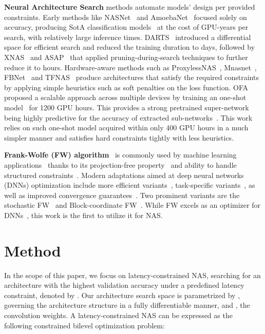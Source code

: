 \documentclass[dvipsnames,table,xcdraw]{article}
\begin{document}
\textbf{Neural Architecture Search} methods automate models' design per provided constraints. Early methods like NASNet~\cite{zoph2016neural} and AmoebaNet~\cite{real2019regularized} focused solely on accuracy, producing SotA classification models~\cite{huang2019gpipe} at the cost of GPU-years per search, with relatively large inference times. DARTS~\cite{liu2018darts} introduced a differential space for efficient search and reduced the training duration to days, followed by XNAS~\cite{nayman2019xnas} and ASAP~\cite{noy2020asap} that applied pruning-during-search techniques to further reduce it to hours. 
Hardware-aware methods such as ProxylessNAS~\cite{cai2018proxylessnas}, Mnasnet~\cite{tan2019mnasnet}, FBNet~\cite{fbnet} and TFNAS~\cite{TF-NAS} 
produce architectures that satisfy the required constraints by applying simple heuristics such as soft penalties on the loss function.
OFA~\cite{OFA} proposed a scalable approach across multiple devices by training an one-shot model~\cite{brock2017smash,bender2018understanding} for 1200 GPU hours. This provides a strong pretrained super-network being highly predictive for the accuracy of extracted sub-networks~\cite{SPOS,fairnas,yu2020train}. This work relies on such one-shot model acquired within only 400 GPU hours in a much simpler manner and satisfies hard constraints tightly with less heuristics.



\textbf{Frank-Wolfe (FW) algorithm}~\cite{frank_wolfe} 
is commonly used by machine learning applications~\cite{sun2019survey} thanks to its projection-free property~\cite{combettes2020projection,hazan2020faster} and ability to handle structured constraints~\cite{jaggi2013revisiting}. Modern adaptations aimed at deep neural networks (DNNs) optimization include more efficient variants~\cite{zhang2020quantized,combettes2020projection}, task-specific variants~\cite{chen2020frank,tsiligkaridis2020frank}, as well as improved convergence guarantees~\cite{lacoste2015global,d2020global}. Two prominent variants are the stochastic FW~\cite{hazan2016variance} and Block-coordinate FW~\cite{lacoste2013block}.
While FW excels as an optimizer for DNNs~\cite{berrada2018deep,pokutta2020deep}, this work is the first to utilize it for NAS.





\section{Method} \label{sec:method}
In the scope of this paper, we focus on latency-constrained NAS, searching for an architecture with the highest validation accuracy under a predefined latency constraint, denoted by . Our architecture search space  is parametrized by , governing the architecture structure in a fully differentiable manner, and , the convolution weights.
A latency-constrained NAS can be expressed as the following constrained bilevel optimization problem:
\end{document}
